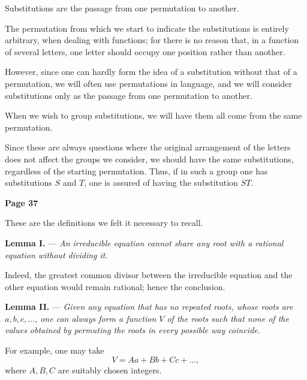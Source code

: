 \documentclass{article}
\begin{document}
Substitutions are the passage from one permutation to another.

\smallskip

The permutation from which we start to indicate the substitutions is entirely arbitrary, when dealing with functions; for there is no reason that, in a function of several letters, one letter should occupy one position rather than another.

\smallskip

However, since one can hardly form the idea of a substitution without that of a permutation, we will often use permutations in language, and we will consider substitutions only as the passage from one permutation to another.

\smallskip

When we wish to group substitutions, we will have them all come from the same permutation.

\smallskip

Since these are always questions where the original arrangement of the letters does not affect the groups we consider, we should have the same substitutions, regardless of the starting permutation. Thus, if in such a group one has substitutions \(S\) and \(T\), one is assured of having the substitution \(ST\). 

\newpage

\centerline{\textbf{Page 37}}

\medskip

These are the definitions we felt it necessary to recall.

\smallskip


\textbf{Lemma I.} --- \textit{An irreducible equation cannot share any root with a rational equation without dividing it.}

\smallskip

Indeed, the greatest common divisor between the irreducible equation and the other equation would remain rational; hence the conclusion.

\smallskip


\textbf{Lemma II.} --- \textit{Given any equation that has no repeated roots, whose roots are \(a, b, c, \dots\), one can always form a function \(V\) of the roots such that none of the values obtained by permuting the roots in every possible way coincide.}

\smallskip

For example, one may take
\[
V = Aa + Bb + Cc + \dots,
\]
where \(A, B, C\) are suitably chosen integers.
\end{document}
